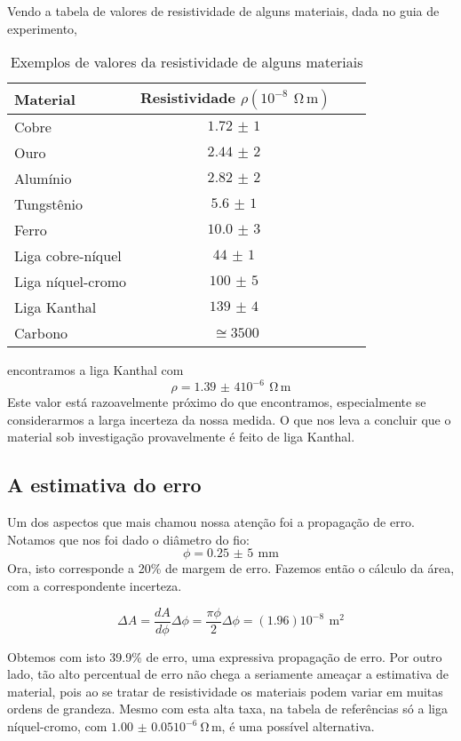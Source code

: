 \documentclass[14pt,twocolumn ]{article}
\begin{document}
Vendo a tabela de valores de resistividade de alguns materiais, dada no guia de experimento,
\begin{table}[ht]
\centering
\caption{Exemplos de valores da resistividade de alguns materiais}
\begin{tabular}[t]{lccr}
\toprule
Material    &Resistividade $ \rho  (\SI{}10^{-8}\,\SI{}{\ohm \, \meter}) $ \\
\midrule
   Cobre&$\SI{1,72(1)}{}$\\
   Ouro&$\SI{2,44(2)}{}$\\
   Alumínio&$\SI{2,82(2)}{}$\\
   Tungstênio&$\SI{5,6(1)}{}$\\
   Ferro&$\SI{10,0(3)}{}$\\
    Liga cobre-níquel&$\SI{44(1)}{}$\\
    Liga níquel-cromo&$\SI{100(5)}{}$\\
    Liga Kanthal&$\SI{139(4)}{}$\\
    Carbono&$\cong3500$\\

    
\bottomrule
\end{tabular}
\end{table}%

encontramos a liga Kanthal com $$ \rho =  \SI{1,39(4)}10^{-6}\,\SI{}{\ohm \, \meter} $$ Este valor está razoavelmente próximo do que encontramos, especialmente se considerarmos a larga incerteza da nossa medida. O que nos leva a concluir que o material sob investigação provavelmente é feito de liga Kanthal.


\subsection{A estimativa do erro}

Um dos aspectos que mais chamou nossa atenção foi a propagação de erro. Notamos que nos foi dado o diâmetro do fio:
$$ {\phi} =  \SI{0,25(5)}\,\SI{}{\mm} $$
Ora, isto corresponde a 20\% de margem de erro. Fazemos então o cálculo da área, com a correspondente incerteza.

$$\Delta A = \frac{dA}{d\phi}\Delta \phi=\frac{\pi \phi}{2}\Delta \phi= (1.96)10^{-8}  \SI{}{\, \meter\squared}$$ 

Obtemos com isto 39.9\% de erro, uma expressiva propagação de erro.
Por outro lado, tão alto percentual de erro não chega a seriamente ameaçar a estimativa de material, pois ao se tratar de resistividade os materiais podem variar em muitas ordens de grandeza. Mesmo com esta alta taxa, na tabela de referências só a liga níquel-cromo, com $\SI{1.00(5)}10^{-6}\SI{}{\ohm \, \meter}$, é uma possível alternativa.
\end{document}
